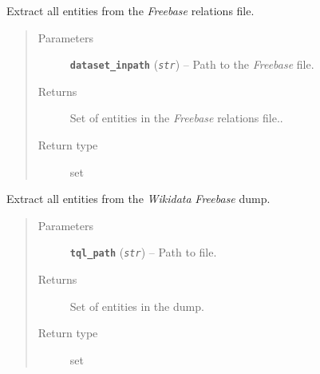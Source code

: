 \documentclass[letterpaper,10pt,english]{sphinxmanual}
\begin{document}

\begin{fulllineitems}
\label{src.trans_e:src.trans_e.contains_entities.extract_entities_from_relation_dataset}
Extract all entities from the \emph{Freebase} relations file.
\begin{quote}\begin{description}
\item[{Parameters}] \leavevmode
\textbf{\texttt{dataset\_inpath}} (\emph{\texttt{str}}) -- Path to the \emph{Freebase} file.

\item[{Returns}] \leavevmode
Set of entities in the \emph{Freebase} relations file..

\item[{Return type}] \leavevmode
set

\end{description}\end{quote}

\end{fulllineitems}


\begin{fulllineitems}
\label{src.trans_e:src.trans_e.contains_entities.extract_entities_from_tql_file}
Extract all entities from the  \emph{Wikidata} \emph{Freebase} dump.
\begin{quote}\begin{description}
\item[{Parameters}] \leavevmode
\textbf{\texttt{tql\_path}} (\emph{\texttt{str}}) -- Path to  file.

\item[{Returns}] \leavevmode
Set of entities in the  dump.

\item[{Return type}] \leavevmode
set

\end{description}\end{quote}

\end{fulllineitems}

\end{document}
